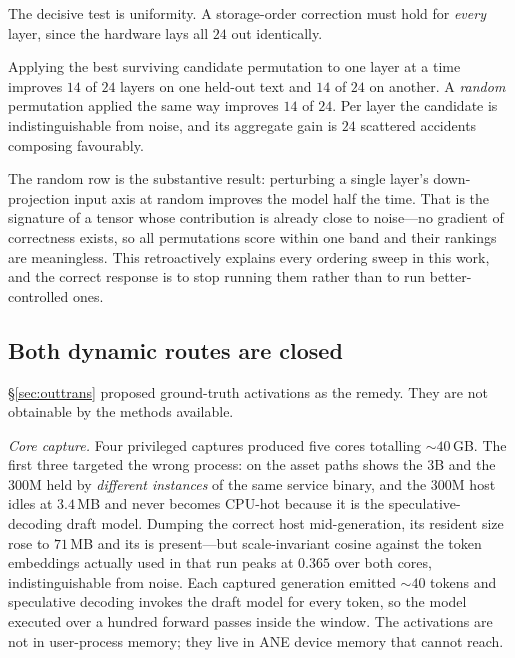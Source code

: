 The decisive test is uniformity. A storage-order correction must hold for \emph{every} layer, since
the hardware lays all $24$ out identically.

\begin{finding}\label{find:nopower}
Applying the best surviving candidate permutation to one layer at a time improves $14$ of $24$
layers on one held-out text and $14$ of $24$ on another. A \emph{random} permutation applied the same
way improves $14$ of $24$. Per layer the candidate is indistinguishable from noise, and its
aggregate gain is $24$ scattered accidents composing favourably.
\end{finding}

\noindent The random row is the substantive result: perturbing a single layer's down-projection input
axis at random improves the model half the time. That is the signature of a tensor whose contribution
is already close to noise---no gradient of correctness exists, so all permutations score within one
band and their rankings are meaningless. This retroactively explains every ordering sweep in this
work, and the correct response is to stop running them rather than to run better-controlled ones.

\subsection{Both dynamic routes are closed}

\S\ref{sec:outtrans} proposed ground-truth activations as the remedy. They are not obtainable by the
methods available.

\emph{Core capture.} Four privileged captures produced five cores totalling ${\sim}40$\,GB. The first
three targeted the wrong process:  on the asset paths shows the $3$B and the $300$M held by
\emph{different instances} of the same service binary, and the $300$M host idles at $3.4$\,MB and
never becomes CPU-hot because it is the speculative-decoding draft model. Dumping the correct host
mid-generation, its resident size rose to $71$\,MB and its  is present---but
scale-invariant cosine against the token embeddings actually used in that run peaks at $0.365$ over
both cores, indistinguishable from noise. Each captured generation emitted ${\sim}40$ tokens and
speculative decoding invokes the draft model for every token, so the model executed over a hundred
forward passes inside the window. The activations are not in user-process memory; they live in ANE
device memory that  cannot reach.

